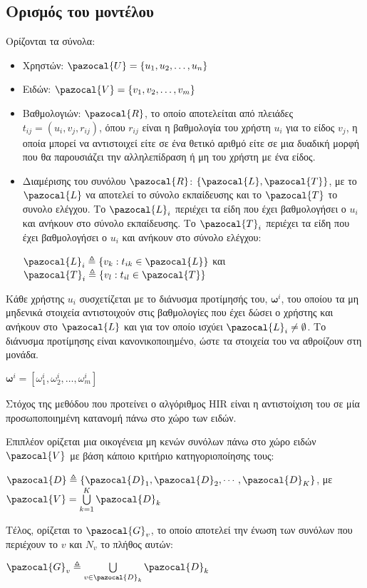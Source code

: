 \subsection{Ορισμός του μοντέλου}
Ορίζονται τα σύνολα:
\begin{itemize}
 \item Χρηστών: $\pazocal{U} = \{u_1, u_2, \dots, u_n\}$
 \item Ειδών: $\pazocal{V} = \{ v_1, v_2, \dots, v_m \}$
 \item Βαθμολογιών: $\pazocal{R}$, το οποίο αποτελείται από πλειάδες $t_{ij} = (u_i, v_j, r_{ij})$, όπου $r_{ij}$ είναι η βαθμολογία του χρήστη $u_i$ για το είδος $v_j$, η οποία μπορεί να αντιστοιχεί είτε σε ένα θετικό αριθμό είτε σε μια δυαδική μορφή που θα παρουσιάζει την αλληλεπίδραση ή μη του χρήστη με ένα είδος.
 \item Διαμέρισης του συνόλου $\pazocal{R}$: $\{\pazocal{L}, \pazocal{T}\}$, με το $\pazocal{L}$ να αποτελεί το σύνολο εκπαί\-δευσης και το $\pazocal{T}$ το συνολο ελέγχου. Το $\pazocal{L}_i$ περιέχει τα είδη που έχει βαθμολογήσει ο $u_i$ και ανήκουν στο σύνολο εκπαίδευσης. Το $\pazocal{T}_i$ περιέχει τα είδη που έχει βαθμολογήσει ο $u_i$ και ανήκουν στο σύνολο ελέγχου:
 \begin{center} $\pazocal{L}_i \triangleq \{v_k : t_{ik} \in \pazocal{L} \}$ και $\pazocal{T}_i \triangleq \{v_l : t_{il} \in \pazocal{T} \}$
 \end{center}
\end{itemize}\par
Κάθε χρήστης $u_i$ συσχετίζεται με το διάνυσμα προτίμησής του, $\boldsymbol{\omega}^{i}$, του οποίου τα μη μηδενικά στοιχεία αντιστοιχούν στις βαθμολογίες που έχει δώσει ο χρήστης και ανήκουν στο $\pazocal{L}$ και για τον οποίο ισχύει $\pazocal{L}_i \neq \emptyset$. Το διάνυσμα προτίμησης είναι κανονικοποιημένο, ώστε τα στοιχεία του να αθροίζουν στη μονάδα. 
\begin{center}
$\boldsymbol{\omega}^i = [\omega_1^i, \omega_2^i, \dots, \omega_m^i ]$
\end{center}\par
Στόχος της μεθόδου που προτείνει ο αλγόριθμος {\en HIR} είναι η αντιστοίχιση του σε μία προσωποποιημένη κατανομή πάνω στο χώρο των ειδών.\par
Επιπλέον ορίζεται μια οικογένεια μη κενών συνόλων πάνω στο χώρο ειδών $\pazocal{V}$ με βάση κάποιο κριτήριο κατηγοριοποίησης τους:
\begin{center}
$\pazocal{D} \triangleq \{\pazocal{D}_1, \pazocal{D}_2, \cdots, \pazocal{D}_K\}$, με $\pazocal{V} = \bigcup\limits_{k=1}^{K} \pazocal{D}_k$
\end{center}
Τέλος, ορίζεται το $\pazocal{G}_v$, το οποίο αποτελεί την ένωση των συνόλων που περιέχουν το $v$ και $N_v$ το πλήθος αυτών:
\begin{center}
$\pazocal{G}_v \triangleq \bigcup\limits_{v \in \pazocal{D}_k} \pazocal{D}_k$
\end{center}
